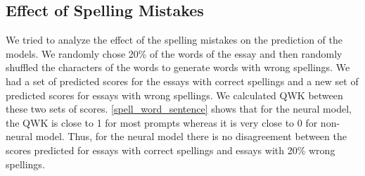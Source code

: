 \documentclass[11pt,a4paper]{article}
\begin{document}
\begin{table}[]
  \centering
  \caption{Effect of Length}
  \label{length}
  \end{table}


\subsection{Effect of Spelling Mistakes}
We tried to analyze the effect of the spelling mistakes on the prediction of the models. We randomly chose 20\% of the words of the essay and then randomly shuffled the characters of the words to generate words with wrong spellings. We had a set of predicted scores for the essays with correct spellings and a new set of predicted scores for essays with wrong spellings. We calculated QWK between these two sets of scores. \cref{spell_word_sentence} shows that for the neural model, the QWK is close to 1 for most prompts whereas it is very close to 0 for non-neural model. Thus, for the neural model there is no disagreement between the scores predicted for essays with correct spellings and essays with 20\% wrong spellings.
\end{document}
